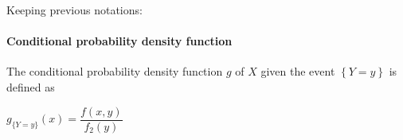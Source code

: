 Keeping previous notations:
\paragraph{Conditional probability density function}
The conditional probability density function $g$ of $X$ given the event
$\left\{ Y=y \right\}$ is defined as 
\begin{center}
	$g_{ \{Y=y\}}(x)=\dfrac{f(x,y)}{f_{2}(y)}$
\end{center}
